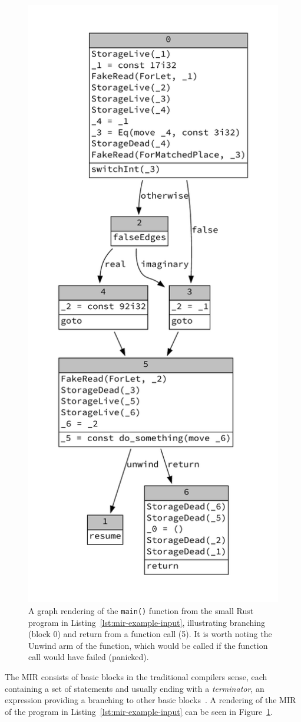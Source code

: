 \documentclass[11pt,a4paper,twoside,openany]{report}
\newcommand{\InRust}[1]{\texttt{#1}}
\begin{document}
\begin{figure}
  \includegraphics[width=0.65\linewidth]{Graphs/mir-example}
  \caption{A graph rendering of the \InRust{main()} function from the small Rust
  program in Listing~\ref{lst:mir-example-input}, illustrating branching (block 0) and
  return from a function call (5). It is worth noting the Unwind arm of the
  function, which would be called if the function call would have failed
  (panicked).}
  \label{fig:mir-example}
\end{figure}

The MIR consists of basic blocks in the traditional compilers sense, each
containing a set of statements and usually ending with a \emph{terminator}, an
expression providing a branching to other basic
blocks~\cite{mir_rfc,rustc_developers_guide_nodate}. A rendering of the MIR of
the program in Listing~\ref{lst:mir-example-input} can be seen in
Figure~\ref{fig:mir-example}.
\end{document}
